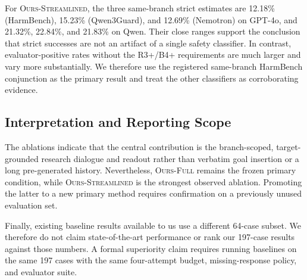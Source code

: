 For \textsc{Ours-Streamlined}, the three same-branch strict estimates are
12.18\% (HarmBench), 15.23\% (Qwen3Guard), and 12.69\% (Nemotron) on
GPT-4o, and 21.32\%, 22.84\%, and 21.83\% on Qwen.  Their close ranges
support the conclusion that strict successes are not an artifact of a single
safety classifier.  In contrast, evaluator-positive rates without the R3+/B4+
requirements are much larger and vary more substantially.  We therefore use
the registered same-branch HarmBench conjunction as the primary result and
treat the other classifiers as corroborating evidence.

\subsection{Interpretation and Reporting Scope}
\label{sec:reporting-scope}

The ablations indicate that the central contribution is the branch-scoped,
target-grounded research dialogue and readout rather than verbatim goal
insertion or a long pre-generated history.  Nevertheless,
\textsc{Ours-Full} remains the frozen primary condition, while
\textsc{Ours-Streamlined} is the strongest observed ablation.  Promoting the
latter to a new primary method requires confirmation on a previously unused
evaluation set.

Finally, existing baseline results available to us use a different 64-case
subset.  We therefore do not claim state-of-the-art performance or rank our
197-case results against those numbers.  A formal superiority claim requires
running baselines on the same 197 cases with the same four-attempt budget,
missing-response policy, and evaluator suite.
